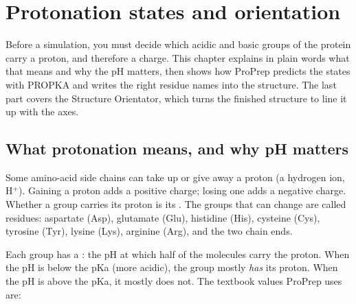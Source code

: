 \chapter{Protonation states and orientation}
\label{ch:protonation}

Before a simulation, you must decide which acidic and basic groups of the
protein carry a proton, and therefore a charge. This chapter explains in plain
words what that means and why the pH matters, then shows how ProPrep predicts
the states with PROPKA and writes the right residue names into the structure.
The last part covers the Structure Orientator, which turns the finished
structure to line it up with the axes.

\begin{glance}
\end{glance}

\section{What protonation means, and why pH matters}
\label{sec:protonation-why}

Some amino-acid side chains can take up or give away a proton (a hydrogen ion,
H$^+$). Gaining a proton adds a positive charge; losing one adds a negative
charge. Whether a group carries its proton is its . The
groups that can change are called  residues: aspartate (Asp),
glutamate (Glu), histidine (His), cysteine (Cys), tyrosine (Tyr), lysine (Lys),
arginine (Arg), and the two chain ends.

Each group has a : the pH at which half of the molecules carry the
proton. When the pH is below the pKa (more acidic), the group mostly
\emph{has} its proton. When the pH is above the pKa, it mostly does not. The
textbook values ProPrep uses are:

